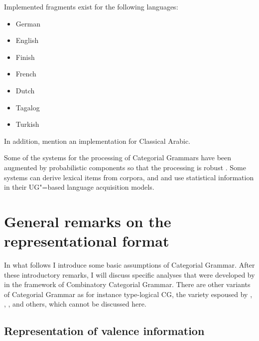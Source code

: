 Implemented fragments exist for the following languages:
\begin{itemize}
\item German \citep*{Uszkoreit86d,KoenigE99a-u,VHE2003a,VTBS2011a}
\item English \citep{Villavicencio2002a,Baldridge2002a-u,Beavers2002a-u,Beavers2004a-u}
\item Finish \citep{Karttunen89a-u}
\item French \citep*{BBCG87a-u}
\item Dutch \citep{BvN94a-u,Baldridge2002a-u}
\item Tagalog \citep{Baldridge2002a-u}
\item Turkish \citep{Hoffmann95a-u,Baldridge2002a-u}
\end{itemize}
In addition, \citet*[]{BCPW2007a} mention an implementation for Classical Arabic.

Some of the systems for the processing of Categorial Grammars have been augmented by probabilistic
components so that the processing is robust \citep*{OB97a,CHS2002a-u}. Some systems can derive lexical items from corpora, and \citet{Briscoe2000a} and \citet{Villavicencio2002a} use statistical
information in their UG"=based language acquisition models.




\section{General remarks on the representational format}

In what follows I introduce some basic assumptions of Categorial Grammar. After these
introductory remarks, I will discuss specific analyses that were developed by \citet{Steedman97a}
in the framework of Combinatory Categorial Grammar. There are other variants of Categorial Grammar as for instance type-logical CG,
the variety espoused by \citet{Morrill94a-u}, \citet{Dowty97a-u}, \citet{Moortgat2011a-u}, and others, which cannot be discussed here.

\subsection{Representation of valence information}
\label{sec-forward-backward-application}

